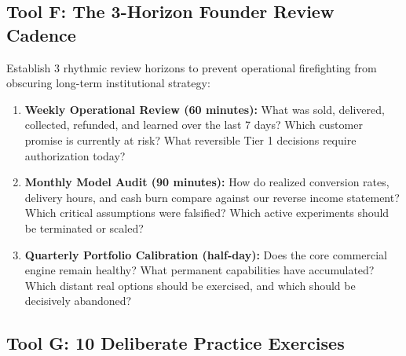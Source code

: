 \subsection{Tool F: The 3-Horizon Founder Review Cadence}

Establish 3 rhythmic review horizons to prevent operational firefighting from obscuring long-term institutional strategy:

\begin{enumerate}[leftmargin=12pt,itemsep=2pt,topsep=1pt,parsep=0pt]
  \item \textbf{Weekly Operational Review (60 minutes):} What was sold, delivered, collected, refunded, and learned over the last 7 days? Which customer promise is currently at risk? What reversible Tier 1 decisions require authorization today?
  \item \textbf{Monthly Model Audit (90 minutes):} How do realized conversion rates, delivery hours, and cash burn compare against our reverse income statement? Which critical assumptions were falsified? Which active experiments should be terminated or scaled?
  \item \textbf{Quarterly Portfolio Calibration (half-day):} Does the core commercial engine remain healthy? What permanent capabilities have accumulated? Which distant real options should be exercised, and which should be decisively abandoned?
\end{enumerate}

\subsection{Tool G: 10 Deliberate Practice Exercises}

